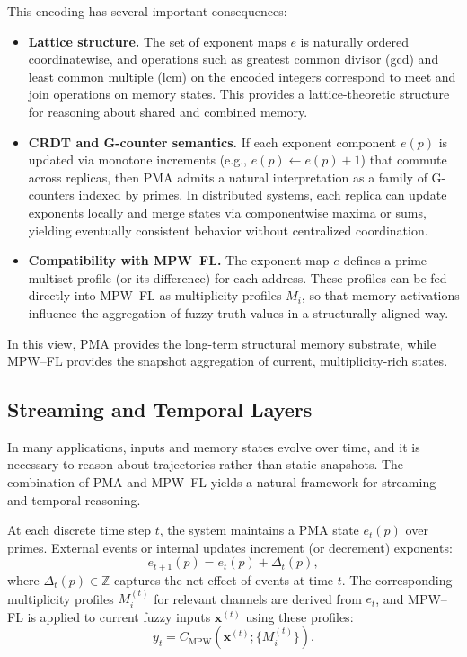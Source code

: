 \documentclass[11pt]{article}
\begin{document}
This encoding has several important consequences:
\begin{itemize}
  \item \textbf{Lattice structure.} The set of exponent maps $e$ is naturally ordered coordinatewise, and operations such as greatest common divisor (gcd) and least common multiple (lcm) on the encoded integers correspond to meet and join operations on memory states. This provides a lattice-theoretic structure for reasoning about shared and combined memory.
  \item \textbf{CRDT and G-counter semantics.} If each exponent component $e(p)$ is updated via monotone increments (e.g., $e(p) \gets e(p) + 1$) that commute across replicas, then PMA admits a natural interpretation as a family of G-counters indexed by primes. In distributed systems, each replica can update exponents locally and merge states via componentwise maxima or sums, yielding eventually consistent behavior without centralized coordination.
  \item \textbf{Compatibility with MPW--FL.} The exponent map $e$ defines a prime multiset profile (or its difference) for each address. These profiles can be fed directly into MPW--FL as multiplicity profiles $M_i$, so that memory activations influence the aggregation of fuzzy truth values in a structurally aligned way.
\end{itemize}

In this view, PMA provides the long-term structural memory substrate, while MPW--FL provides the snapshot aggregation of current, multiplicity-rich states.

\subsection{Streaming and Temporal Layers}
\label{subsec:streaming-temporal}

In many applications, inputs and memory states evolve over time, and it is necessary to reason about trajectories rather than static snapshots. The combination of PMA and MPW--FL yields a natural framework for streaming and temporal reasoning.

At each discrete time step $t$, the system maintains a PMA state $e_t(p)$ over primes. External events or internal updates increment (or decrement) exponents:
\[
  e_{t+1}(p) = e_t(p) + \Delta_t(p),
\]
where $\Delta_t(p) \in \mathbb{Z}$ captures the net effect of events at time $t$. The corresponding multiplicity profiles $M_i^{(t)}$ for relevant channels are derived from $e_t$, and MPW--FL is applied to current fuzzy inputs $\mathbf{x}^{(t)}$ using these profiles:
\[
  y_t = C_{\mathrm{MPW}}(\mathbf{x}^{(t)};\{M_i^{(t)}\}).
\]
\end{document}
